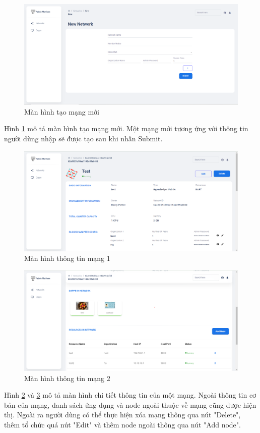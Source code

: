 \documentclass[../DoAn.tex]{subfiles}
\begin{document}
\begin{figure}[H]
    \centering
    \includegraphics[width=0.75\linewidth]{Hinhve/DoAn-ResultNetworkNew.png}
    \caption{Màn hình tạo mạng mới}
    \label{fig:ResultNetworkNew}
\end{figure}

Hình \ref{fig:ResultNetworkNew} mô tả màn hình tạo mạng mới. Một mạng mới tương
ứng với thông tin người dùng nhập sẽ được tạo sau khi nhấn Submit.

\begin{figure}[H]
    \centering
    \includegraphics[width=0.75\linewidth]{Hinhve/DoAn-ResultNetworkDetail1.png}
    \caption{Màn hình thông tin mạng 1}
    \label{fig:ResultNetworkDetail1}
\end{figure}

\begin{figure}[H]
    \centering
    \includegraphics[width=0.75\linewidth]{Hinhve/DoAn-ResultNetworkDetail2.png}
    \caption{Màn hình thông tin mạng 2}
    \label{fig:ResultNetworkDetail2}
\end{figure}

Hình \ref{fig:ResultNetworkDetail1} và \ref{fig:ResultNetworkDetail2} mô tả màn
hình chi tiết thông tin của một mạng. Ngoài thông tin cơ bản của mạng, danh
sách ứng dụng và node ngoài thuộc về mạng cũng được hiện thị. Ngoài ra người
dùng có thể thực hiện xóa mạng thông qua nút "Delete", thêm tổ chức quá nút
"Edit" và thêm node ngoài thông qua nút "Add node".
\end{document}
